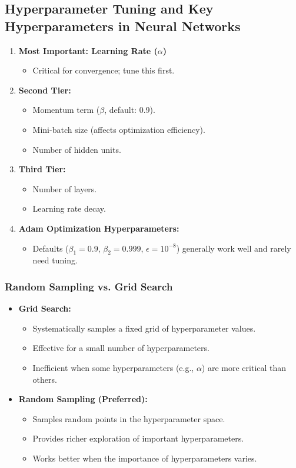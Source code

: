 \documentclass[letterpaper,12pt,notitlepage,twoside]{report}
\begin{document}
\subsection{Hyperparameter Tuning and Key Hyperparameters in Neural Networks}
\begin{enumerate}[nosep]
    \item \textbf{Most Important: Learning Rate ($\alpha$)}  
    \begin{itemize}
        \item Critical for convergence; tune this first.
    \end{itemize}
    \item \textbf{Second Tier:}
    \begin{itemize}
        \item Momentum term ($\beta$, default: 0.9).
        \item Mini-batch size (affects optimization efficiency).
        \item Number of hidden units.
    \end{itemize}
    \item \textbf{Third Tier:}
    \begin{itemize}
        \item Number of layers.
        \item Learning rate decay.
    \end{itemize}
    \item \textbf{Adam Optimization Hyperparameters:}  
    \begin{itemize}
        \item Defaults ($\beta_1 = 0.9$, $\beta_2 = 0.999$, $\epsilon = 10^{-8}$) generally work well and rarely need tuning.
    \end{itemize}
\end{enumerate}

\subsubsection*{Random Sampling vs. Grid Search}
\begin{itemize}[nosep]
    \item \textbf{Grid Search:}
    \begin{itemize}
        \item Systematically samples a fixed grid of hyperparameter values.
        \item Effective for a small number of hyperparameters.
        \item Inefficient when some hyperparameters (e.g., $\alpha$) are more critical than others.
    \end{itemize}
    \item \textbf{Random Sampling (Preferred):}
    \begin{itemize}
        \item Samples random points in the hyperparameter space.
        \item Provides richer exploration of important hyperparameters.
        \item Works better when the importance of hyperparameters varies.
    \end{itemize}
\end{itemize}
\end{document}
